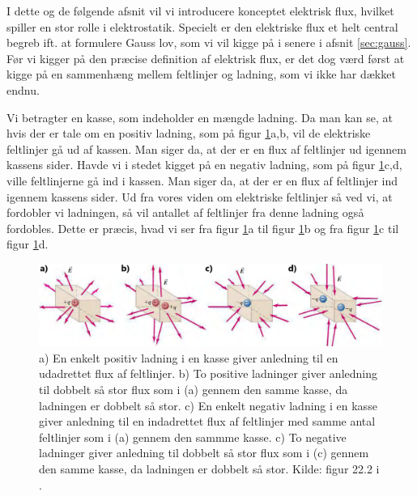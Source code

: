 I dette og de følgende afsnit vil vi introducere konceptet elektrisk flux, hvilket spiller en stor rolle i elektrostatik. Specielt er den elektriske flux et helt central begreb ift. at formulere Gauss lov, som vi vil kigge på i senere i afsnit \ref{sec:gauss}. Før vi kigger på den præcise definition af elektrisk flux, er det dog værd først at kigge på en sammenhæng mellem feltlinjer og ladning, som vi ikke har dækket endnu.

Vi betragter en kasse, som indeholder en mængde ladning. Da man kan se, at hvis der er tale om en positiv ladning, som på figur \ref{fig:ElectricFluxVisualisation}a,b, vil de elektriske feltlinjer gå ud af kassen. Man siger da, at der er en flux af feltlinjer ud igennem kassens sider. Havde vi i stedet kigget på en negativ ladning, som på figur \ref{fig:ElectricFluxVisualisation}c,d, ville feltlinjerne gå ind i kassen. Man siger da, at der er en flux af feltlinjer ind igennem kassens sider. Ud fra vores viden om elektriske feltlinjer så ved vi, at fordobler vi ladningen, så vil antallet af feltlinjer fra denne ladning også fordobles. Dette er præcis, hvad vi ser fra figur \ref{fig:ElectricFluxVisualisation}a til figur \ref{fig:ElectricFluxVisualisation}b og fra figur \ref{fig:ElectricFluxVisualisation}c til figur \ref{fig:ElectricFluxVisualisation}d.

\begin{figure}[h!]
    \centering
    \includegraphics[width=\textwidth]{Elektro/Figurer/ElektricFluxVisualisation.PNG}
    \caption{a) En enkelt positiv ladning i en kasse giver anledning til en udadrettet flux af feltlinjer. b) To positive ladninger giver anledning til dobbelt så stor flux som i (a) gennem den samme kasse, da ladningen er dobbelt så stor. c) En enkelt negativ ladning i en kasse giver anledning til en indadrettet flux af feltlinjer med samme antal feltlinjer som i (a) gennem den sammme kasse. c) To negative ladninger giver anledning til dobbelt så stor flux som i (c) gennem den samme kasse, da ladningen er dobbelt så stor. Kilde: figur 22.2 i \cite{youngSearsZemanskyUniversity2016}.}
    \label{fig:ElectricFluxVisualisation}
\end{figure}

